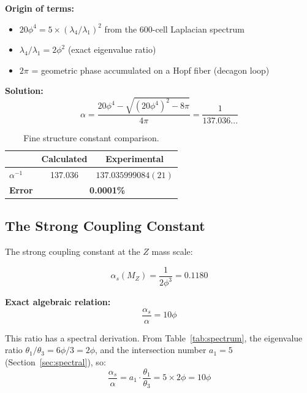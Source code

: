 \documentclass[12pt,a4paper]{article}
\begin{document}
\textbf{Origin of terms:}
\begin{itemize}
    \item $20\phi^4 = 5 \times (\lambda_4/\lambda_1)^2$ from the 600-cell Laplacian spectrum
    \item $\lambda_4/\lambda_1 = 2\phi^2$ (exact eigenvalue ratio)
    \item $2\pi$ = geometric phase accumulated on a Hopf fiber (decagon loop)
\end{itemize}

\textbf{Solution:}
\begin{equation}
\alpha = \frac{20\phi^4 - \sqrt{(20\phi^4)^2 - 8\pi}}{4\pi} = \frac{1}{137.036...}
\end{equation}

\begin{table}[H]
\centering
\begin{tabular}{lcc}
\toprule
& \textbf{Calculated} & \textbf{Experimental \cite{codata2022}} \\
\midrule
$\alpha^{-1}$ & 137.036 & $137.035999084(21)$ \\
\textbf{Error} & \multicolumn{2}{c}{\textbf{0.0001\%}} \\
\bottomrule
\end{tabular}
\caption{Fine structure constant comparison.}
\end{table}

\subsection{The Strong Coupling Constant}

The strong coupling constant at the $Z$ mass scale:

\begin{equation}
\alpha_s(M_Z) = \frac{1}{2\phi^3} = 0.1180
\end{equation}

\textbf{Exact algebraic relation:}
\begin{equation}
\boxed{\frac{\alpha_s}{\alpha} = 10\phi}
\end{equation}

This ratio has a spectral derivation. From Table~\ref{tab:spectrum}, the eigenvalue ratio $\theta_1/\theta_3 = 6\phi/3 = 2\phi$, and the intersection number $a_1 = 5$ (Section~\ref{sec:spectral}), so:
\begin{equation}
\frac{\alpha_s}{\alpha} = a_1 \cdot \frac{\theta_1}{\theta_3} = 5 \times 2\phi = 10\phi
\end{equation}
\end{document}
